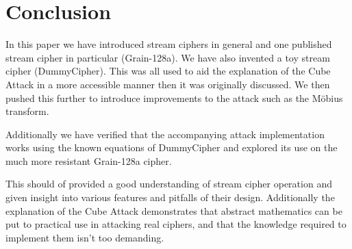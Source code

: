 \documentclass{report}
\begin{document}
\chapter{Conclusion}
In this paper we have introduced stream ciphers in general and one published stream cipher in particular (Grain-128a). We have also invented a toy stream cipher (DummyCipher). This was all used to aid the explanation of the Cube Attack in a more accessible manner then it was originally discussed. We then pushed this further to introduce improvements to the attack such as the M\"{o}bius transform.

Additionally we have verified that the accompanying attack implementation works using the known equations of DummyCipher and explored its use on the much more resistant Grain-128a cipher.

This should of provided a good understanding of stream cipher operation and given insight into various features and pitfalls of their design. Additionally the explanation of the Cube Attack demonstrates that abstract mathematics can be put to practical use in attacking real ciphers, and that the knowledge required to implement them isn't too demanding.


\end{document}
